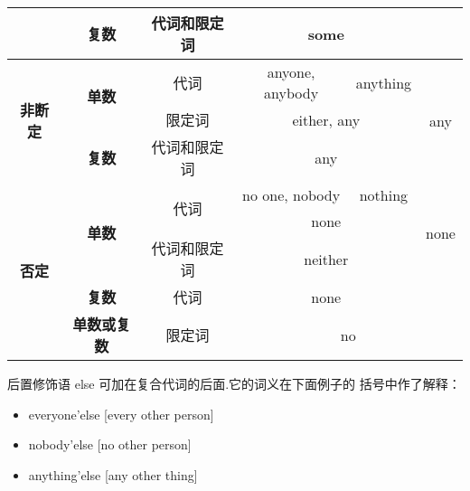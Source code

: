 \begin{table}[hbtp]
{\begin{tabular}{|c|c|c|ccc|}
                     & \textbf{复数}                  & 代词和限定词              & \multicolumn{2}{c|}{some}                                             &                       \\ \hline
\multirow{3}{*}{\textbf{非断定}} & \multirow{2}{*}{\textbf{单数}} & 代词                  & \multicolumn{1}{c|}{anyone, anybody}  & \multicolumn{1}{c|}{anything}  & \multirow{3}{*}{any}  \\ \cline{3-5}
                     &                     & 限定词                 & \multicolumn{2}{c|}{either, any}                                        &                       \\ \cline{2-5}
                     & \textbf{复数}                  & 代词和限定词              & \multicolumn{2}{c|}{any}                                              &                       \\ \hline
\multirow{5}{*}{\textbf{否定}} &
  \multirow{3}{*}{\textbf{单数}} &
  \multirow{2}{*}{代词} &
  \multicolumn{1}{c|}{no one, nobody} &
  \multicolumn{1}{c|}{nothing} &
  \multirow{3}{*}{none} \\ \cline{4-5}
                     &                     &                     & \multicolumn{2}{c|}{none}                                             &                       \\ \cline{3-5}
                     &                     & 代词和限定词              & \multicolumn{2}{c|}{neither}                                          &                       \\ \cline{2-6}
                     & \textbf{复数}                  & 代词                  & \multicolumn{2}{c|}{none}                                             &                       \\ \cline{2-6}
                     & \textbf{单数或复数}               & 限定词                 & \multicolumn{3}{c|}{no}                                                                       \\ \hline
\end{tabular}%
}
\end{table}

后置修饰语 else 可加在复合代词的后面.它的词义在下面例子的
括号中作了解释：
\begin{itemize}
\item everyone'else [every other person]
\item nobody'else [no other person]
\item anything'else [any other thing]
\end{itemize}


